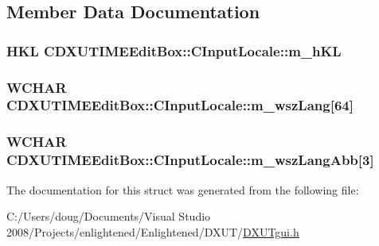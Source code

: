 \subsection{Member Data Documentation}
\hypertarget{struct_c_d_x_u_t_i_m_e_edit_box_1_1_c_input_locale_a1198fa91816b1e3063e53dd28e47b4f3}{
\subsubsection[{m\_\-hKL}]{\setlength{\rightskip}{0pt plus 5cm}HKL {\bf CDXUTIMEEditBox::CInputLocale::m\_\-hKL}}}
\label{struct_c_d_x_u_t_i_m_e_edit_box_1_1_c_input_locale_a1198fa91816b1e3063e53dd28e47b4f3}
\hypertarget{struct_c_d_x_u_t_i_m_e_edit_box_1_1_c_input_locale_ab1cd17da146cda609287fd362873df13}{
\subsubsection[{m\_\-wszLang}]{\setlength{\rightskip}{0pt plus 5cm}WCHAR {\bf CDXUTIMEEditBox::CInputLocale::m\_\-wszLang}\mbox{[}64\mbox{]}}}
\label{struct_c_d_x_u_t_i_m_e_edit_box_1_1_c_input_locale_ab1cd17da146cda609287fd362873df13}
\hypertarget{struct_c_d_x_u_t_i_m_e_edit_box_1_1_c_input_locale_a4ca3b1bba47a1b44a2acd97d91571b68}{
\subsubsection[{m\_\-wszLangAbb}]{\setlength{\rightskip}{0pt plus 5cm}WCHAR {\bf CDXUTIMEEditBox::CInputLocale::m\_\-wszLangAbb}\mbox{[}3\mbox{]}}}
\label{struct_c_d_x_u_t_i_m_e_edit_box_1_1_c_input_locale_a4ca3b1bba47a1b44a2acd97d91571b68}


The documentation for this struct was generated from the following file:\begin{DoxyCompactItemize}
\item 
C:/Users/doug/Documents/Visual Studio 2008/Projects/enlightened/Enlightened/DXUT/\hyperlink{_d_x_u_tgui_8h}{DXUTgui.h}\end{DoxyCompactItemize}
